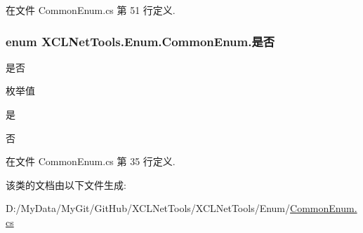 在文件 Common\-Enum.\-cs 第 51 行定义.

\hypertarget{class_x_c_l_net_tools_1_1_enum_1_1_common_enum_a5940e298dc09411c8a238f4f4e94e633}{
\subsubsection[{是否}]{\setlength{\rightskip}{0pt plus 5cm}enum {\bf X\-C\-L\-Net\-Tools.\-Enum.\-Common\-Enum.\-是否}}}\label{class_x_c_l_net_tools_1_1_enum_1_1_common_enum_a5940e298dc09411c8a238f4f4e94e633}


是否 

\begin{Desc}
\item[枚举值]\par
\begin{description}
\item[{\em 
\hypertarget{class_x_c_l_net_tools_1_1_enum_1_1_common_enum_a5940e298dc09411c8a238f4f4e94e633a0a60ac8f02ccd2cf723f927284877851}{是}\label{class_x_c_l_net_tools_1_1_enum_1_1_common_enum_a5940e298dc09411c8a238f4f4e94e633a0a60ac8f02ccd2cf723f927284877851}
}]是 \item[{\em 
\hypertarget{class_x_c_l_net_tools_1_1_enum_1_1_common_enum_a5940e298dc09411c8a238f4f4e94e633ac9744f45e76d885ae1c74d4f4a934b2e}{否}\label{class_x_c_l_net_tools_1_1_enum_1_1_common_enum_a5940e298dc09411c8a238f4f4e94e633ac9744f45e76d885ae1c74d4f4a934b2e}
}]否 \end{description}
\end{Desc}


在文件 Common\-Enum.\-cs 第 35 行定义.



该类的文档由以下文件生成\-:\begin{DoxyCompactItemize}
\item 
D\-:/\-My\-Data/\-My\-Git/\-Git\-Hub/\-X\-C\-L\-Net\-Tools/\-X\-C\-L\-Net\-Tools/\-Enum/\hyperlink{_common_enum_8cs}{Common\-Enum.\-cs}\end{DoxyCompactItemize}
